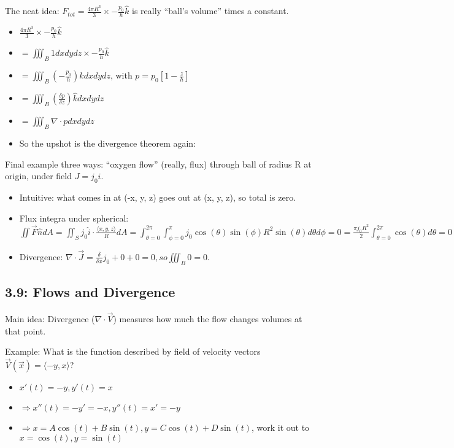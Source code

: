\documentclass[11pt, oneside]{article}   	%
\begin{document}
The neat idea: $F_{tot} = \frac{4\pi R^3}{3} \times -\frac{p_0}{h}\hat{k}$ is really ``ball's volume'' times a constant.
\begin{itemize}
\item $\frac{4\pi R^3}{3} \times  -\frac{p_0}{h}\hat{k}$
\item $= \iiint_B 1 dx dy dz  \times  -\frac{p_0}{h}\hat{k}$

\item $= \iiint_B( -\frac{p_0}{h})\hat{k} dx dy dz$, with $p = p_0[1-\frac{z}{h}]$
\item $=  \iiint_B(\frac{\delta p}{\delta z}) \hat{k} dx dy dz$
\item $=  \iiint_B \nabla \cdot p dx dy dz$
\item So the upshot is the divergence theorem again:
\end{itemize}

Final example three ways: ``oxygen flow'' (really, flux) through ball of radius R at origin, under field $J = j_0\hat{i}$.
\begin{itemize}
\item Intuitive: what comes in at (-x, y, z)  goes out at (x, y, z), so total is zero.
\item Flux integra under spherical: $\iint \vec{F} \hat{n} dA = \iint_S j_0\hat{i} \cdot \frac{\langle x,y,z \rangle }{R} dA = \int_{\theta = 0}^{2\pi}\int_{\phi = 0}^{\pi} j_0 \cos(\theta)\sin(\phi) R^2 \sin(\theta) d\theta d\phi = 0 = \frac{\pi j_0 R^2}{2} \int_{\theta = 0}^{2\pi} \cos(\theta) d\theta = 0$
\item Divergence: $\nabla \cdot \vec{J} = \frac{\delta}{\delta x} j_0 + 0 + 0 = 0, so \iiint_B 0 = 0$.
\end{itemize}

\subsection{3.9: Flows and Divergence}

Main idea: Divergence ($\nabla \cdot \vec{V}$) measures how much the flow changes volumes at that point.

Example: What is the function described by field of velocity vectors $\vec{V}(\vec{x}) = \langle -y, x \rangle$?
\begin{itemize}
\item $x'(t) = -y, y'(t) = x$
\item $\Rightarrow x''(t) = -y' = -x, y''(t) = x' = -y$
\item $\Rightarrow x = A\cos(t) + B\sin(t), y = C\cos(t) + D\sin(t)$, work it out to $x = \cos(t), y = \sin(t)$
\end{itemize}
\end{document}
